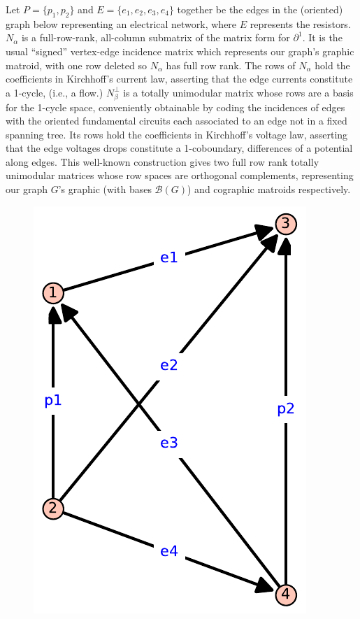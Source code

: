 Let $P=\{p_1, p_2\}$ and $E=\{e_1, e_2, e_3, e_4\}$ together be the edges in the (oriented) graph
below representing an electrical network, where $E$ represents the resistors.   $N_\alpha$ is
a full-row-rank, all-column submatrix of the matrix form for $\partial^1$.  It is the
usual ``signed'' vertex-edge incidence matrix which represents our graph's graphic matroid, with one
row deleted so $N_\alpha$ has full row rank.  The rows of $N_\alpha$ hold the coefficients in
Kirchhoff's current law, asserting that the edge currents constitute a 1-cycle, (i.e., a flow.)
$N_\beta^\perp$ is a totally unimodular matrix whose
rows are a basis for the 1-cycle space, conveniently
obtainable by coding the incidences of edges with the oriented fundamental
circuits each associated to an edge not in a fixed spanning tree.
Its rows hold the coefficients in
Kirchhoff's voltage law, asserting that the edge
voltages drops constitute a 1-coboundary, differences
of a potential along edges.
This well-known construction gives
two full row rank totally unimodular matrices whose row spaces are orthogonal complements,
representing our graph $G$'s
graphic (with bases $\mathcal{B}(G)$) and cographic matroids respectively.

\begin{figure}
  \includegraphics[scale=0.5]{K4.pdf}
\end{figure}

